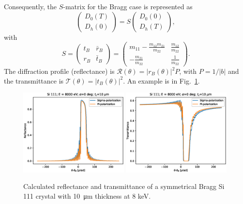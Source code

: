 \documentclass[preprint]{iucr}              %
\begin{document}
Consequently, the $S$-matrix for the Bragg case is represented as 
\begin{equation}\label{eq:scatteringMatrixDefinition}
    \begin{pmatrix}
    D_0(T)\\
    D_h(0)
    \end{pmatrix}
    =
    S
        \begin{pmatrix}
    D_0(0) \\
    D_h(T)
    \end{pmatrix},
\end{equation}
with
\begin{equation}\label{eq:scatteringMatrix}
    S = 
    \begin{pmatrix}
    t_B& 
    \bar{r}_B\\
    r_B& 
    \bar{t}_B
    \end{pmatrix}
    =
    \begin{pmatrix}
    m_{11}-\frac{m_{12} m_{21}}{m_{22}} & 
    \frac{m_{12}}{m_{22}}\\
    -\frac{m_{21}}{m_{22}} & 
    \frac{1}{m_{22}}
    \end{pmatrix}.
\end{equation}
The diffraction profile (reflectance) is   $\mathcal{R}(\theta)=|r_B(\theta)|^2 P$, with $P=1/|b|$ and the transmittance is $\mathcal{T}(\theta)=|t_B(\theta)|^2$. An example is in Fig.~\ref{fig:braggProfiles}. 

\begin{figure}\label{fig:braggProfiles}
    \centering
    \includegraphics[width=0.49\textwidth]{figures/Bragg_1.eps}
    \includegraphics[width=0.49\textwidth]{figures/Bragg_2.eps}
    \caption{Calculated reflectance and transmittance of a symmetrical Bragg Si 111 crystal with \SI{10}{\micro\meter} thickness at 8 keV. }
\end{figure}
\end{document}
